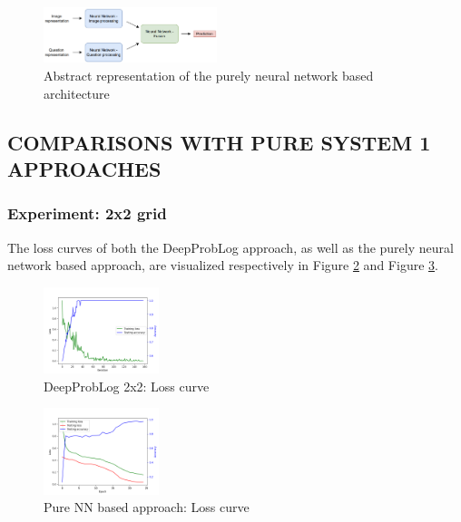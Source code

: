 \documentclass[english]{sobraep}
\begin{document}
\begin{figure}[htp]
    \begin{center}
    \includegraphics[width=0.45\textwidth]{pure_nn_architecture.png} 
    \captionsetup{justification=centering}
    \caption{Abstract representation of the purely neural network based architecture}
    \label{fig:pure_nn_network}
    \end{center}
\end{figure}

\subsection{COMPARISONS WITH PURE SYSTEM 1 APPROACHES}
\label{subsec:experiments_NN_vs_deepproblog}
\subsubsection{Experiment: 2x2 grid}
The loss curves of both the DeepProbLog approach, as well as the purely neural network based approach, are visualized respectively in Figure \ref{fig:loss_curve_deepproblog_2x2} and Figure \ref{fig:loss_curve_pure_NN_2x2}.

\begin{figure}[htp]
    \begin{center}
    \includegraphics[width=0.3\textwidth]{loss_curve_deepproblog_2x2.png} 
    \captionsetup{justification=centering}
    \caption{DeepProbLog 2x2: Loss curve}
    \label{fig:loss_curve_deepproblog_2x2}
    \end{center}
\end{figure}

\begin{figure}[htp]
    \begin{center}
    \includegraphics[width=0.3\textwidth]{loss_curve_pure_NN_2x2.png} 
    \captionsetup{justification=centering}
    \caption{Pure NN based approach: Loss curve}
    \label{fig:loss_curve_pure_NN_2x2}
    \end{center}
\end{figure}
\end{document}
